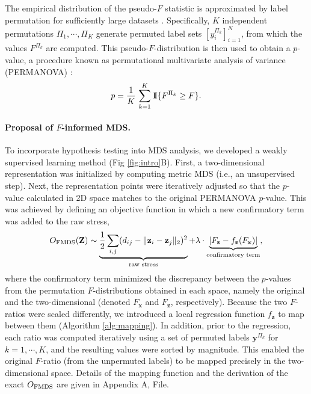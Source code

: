 \documentclass[10pt,letterpaper]{article}
\newcommand{\1}{{\rm 1}\kern-0.24em{\rm I}}
\begin{document}
The empirical distribution of the pseudo-$F$ statistic is approximated by label permutation for sufficiently large datasets \cite{holmes96, gijbels13}.
Specifically, $K$ independent permutations $\Pi_1 , \cdots ,\Pi_K$ generate permuted label sets $[y_i^{\Pi_k}]_{i=1}^{N}$, from which the values $F^{\Pi_k}$ are computed. This pseudo-$F$-distribution is then used to obtain a $p$-value, a procedure known as permutational multivariate analysis of variance (PERMANOVA) \cite{anderson01}:
\begin{equation}
p = \frac{1}{K}\,\sum_{k=1}^{K}\1\{F^{\Pi_k}\geq F\}.
\end{equation}

\paragraph*{Proposal of $F$-informed MDS.}
To incorporate hypothesis testing into MDS analysis, we developed a weakly supervised learning method (Fig \ref{fig:intro}B).
First, a two-dimensional representation was initialized by computing metric MDS (i.e., an unsupervised step).
Next, the representation points were iteratively adjusted so that the $p$-value calculated in 2D space matches to the original PERMANOVA $p$-value.
This was achieved by defining an objective function in which a new confirmatory term was added to the raw stress,
\begin{equation} \label{eq:fmds}
    O_{\rm FMDS}(\mathbf{Z}) \sim
    \underbrace{\frac{1}{2}\sum_{i,j} (d_{ij} - \| \mathbf{z}_i - \mathbf{z}_j \|_2 )^2}_\text{raw stress} +
    \lambda\cdot \underbrace{\left|F_\mathbf{z} - f_\mathbf{z}(F_\mathbf{x})\right|}_\text{confirmatory term},
\end{equation}
where the confirmatory term minimized the discrepancy between the $p$-values from the permutation $F$-distributions obtained in each space, namely the original and the two-dimensional (denoted $F_\mathbf{x}$ and $F_\mathbf{z}$, respectively).
Because the two $F$-ratios were scaled differently, we introduced a local regression function $f_\mathbf{z}$ to map between them (Algorithm \ref{alg:mapping}). In addition, prior to the regression, each ratio was computed iteratively using a set of permuted labels $\mathbf{y}^{\Pi_k}$ for $k=1, \cdots, K$, and the resulting values were sorted by magnitude. This enabled the original $F$-ratio (from the unpermuted labels) to be mapped precisely in the two-dimensional space.
Details of the mapping function and the derivation of the exact $O_{\rm FMDS}$ are given in Appendix A,  File.
\end{document}
